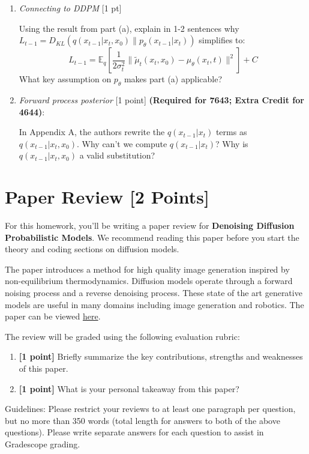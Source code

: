\documentclass[11pt,english]{article}
\begin{document}
\begin{enumerate}
\begin{enumerate}
    
        \item \textit{Connecting to DDPM} [1 pt]
        
        Using the result from part (a), explain in 1-2 sentences why $L_{t-1} = D_{KL}(q(x_{t-1}|x_t,x_0) \| p_\theta(x_{t-1}|x_t))$ simplifies to:
        \[L_{t-1} = \mathbb{E}_q\left[\frac{1}{2\sigma_t^2}\|\tilde\mu_t(x_t,x_0) - \mu_\theta(x_t,t)\|^2\right] + C\]
        What key assumption on $p_\theta$ makes part (a) applicable?


        \item \textit{Forward process posterior} 
        [1 point] \textbf{(Required for 7643; Extra Credit for 4644)}: 

        In Appendix A, the authors rewrite the $q(x_{t-1}|x_t)$ terms as $q(x_{t-1}|x_t,x_0)$. Why can't we compute $q(x_{t-1}|x_t)$? Why is $q(x_{t-1}|x_t,x_0)$ a valid substitution?
    \end{enumerate}

\end{enumerate}

\newpage
\section{Paper Review [2 Points]}
For this homework, you'll be writing a paper review for \textbf{Denoising Diffusion Probabilistic Models}.  We recommend reading this paper before you start the theory and coding sections on diffusion models. 

The paper introduces a method for high quality image generation inspired by non-equilibrium thermodynamics. Diffusion models operate through a forward noising process and a reverse denoising process.  These state of the art generative models are useful in many domains including image generation and robotics. The paper can be viewed \href{https://arxiv.org/abs/2006.11239}{here}.

\vspace{2mm}
The review will be graded using the following evaluation rubric:
\begin{enumerate}
\item
\textbf{[1 point]}
Briefly summarize the key contributions, strengths and weaknesses of this paper.

\item
\textbf{[1 point]}
What is your personal takeaway from this paper? 

\end{enumerate}

Guidelines: Please restrict your reviews to at least one paragraph per question, but no more than 350 words (total length for answers to both of the above questions). Please write separate answers for each question to assist in Gradescope grading.
\end{document}
